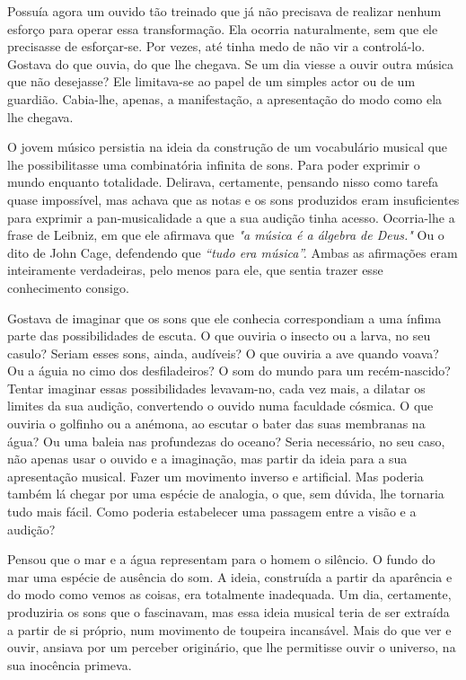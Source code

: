 Possuía agora um ouvido tão treinado que já não precisava de realizar
nenhum esforço para operar essa transformação. Ela ocorria naturalmente,
sem que ele precisasse de esforçar-se. Por vezes, até tinha medo de não
vir a controlá-lo. Gostava do que ouvia, do que lhe chegava. Se um dia
viesse a ouvir outra música que não desejasse? Ele limitava-se ao papel
de um simples actor ou de um guardião. Cabia-lhe, apenas, a
manifestação, a apresentação do modo como ela lhe chegava.

O jovem músico persistia na ideia da construção de um vocabulário
musical que lhe possibilitasse uma combinatória infinita de sons. Para
poder exprimir o mundo enquanto totalidade. Delirava, certamente,
pensando nisso como tarefa quase impossível, mas achava que as notas e
os sons produzidos eram insuficientes para exprimir a pan-musicalidade a
que a sua audição tinha acesso. Ocorria-lhe a frase de Leibniz, em que
ele afirmava que \emph{"a música é a álgebra de Deus."} Ou o dito de
John Cage, defendendo que \emph{``tudo era música''.} Ambas as
afirmações eram inteiramente verdadeiras, pelo menos para ele, que
sentia trazer esse conhecimento consigo.

Gostava de imaginar que os sons que ele conhecia correspondiam a uma
ínfima parte das possibilidades de escuta. O que ouviria o insecto ou a
larva, no seu casulo? Seriam esses sons, ainda, audíveis? O que ouviria
a ave quando voava? Ou a águia no cimo dos desfiladeiros? O som do mundo
para um recém-nascido? Tentar imaginar essas possibilidades levavam-no,
cada vez mais, a dilatar os limites da sua audição, convertendo o ouvido
numa faculdade cósmica. O que ouviria o golfinho ou a anémona, ao
escutar o bater das suas membranas na água? Ou uma baleia nas
profundezas do oceano? Seria necessário, no seu caso, não apenas usar o
ouvido e a imaginação, mas partir da ideia para a sua apresentação
musical. Fazer um movimento inverso e artificial. Mas poderia também lá
chegar por uma espécie de analogia, o que, sem dúvida, lhe tornaria tudo
mais fácil. Como poderia estabelecer uma passagem entre a visão e a
audição?

Pensou que o mar e a água representam para o homem o silêncio. O fundo
do mar uma espécie de ausência do som. A ideia, construída a partir da
aparência e do modo como vemos as coisas, era totalmente inadequada. Um
dia, certamente, produziria os sons que o fascinavam, mas essa ideia
musical teria de ser extraída a partir de si próprio, num movimento de
toupeira incansável. Mais do que ver e ouvir, ansiava por um perceber
originário, que lhe permitisse ouvir o universo, na sua inocência
primeva.

